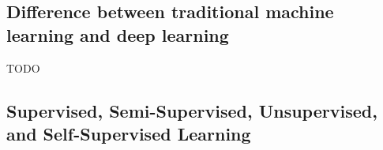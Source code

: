 
\subsection{Difference between traditional machine learning and deep learning}
\label{subsec:processing_signals_ml_and_dl_difference}


TODO


\subsection{Supervised, Semi-Supervised, Unsupervised, and Self-Supervised Learning}
\label{subsec:processing_signals_ml_and_dl_tyes_of_learning_supervision}


